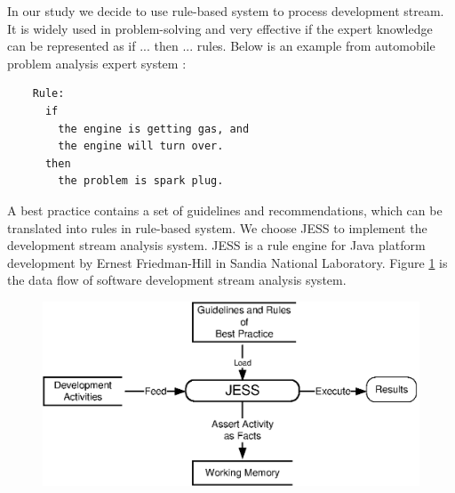 In our study we decide to use rule-based system to process development
stream. It is widely used in problem-solving and very effective if the
expert knowledge can be represented as if ... then ...  rules. Below is an
example from automobile problem analysis expert system \cite{Luger:01}:
\begin{verbatim}
    Rule: 
      if 
        the engine is getting gas, and 
        the engine will turn over.
      then 
        the problem is spark plug.  
\end{verbatim}
A best practice contains a set of guidelines and recommendations, which can
be translated into rules in rule-based system. We choose JESS to implement
the development stream analysis system. JESS is a rule engine for Java
platform development by Ernest Friedman-Hill in Sandia National Laboratory.
Figure \ref{fig:DataFlow} is the data flow of software development stream
analysis system.
\begin{figure}[h] 
  \centering
  \includegraphics{figs/DataFlow.eps}
  \caption{}\label{fig:DataFlow}
\end{figure} 

